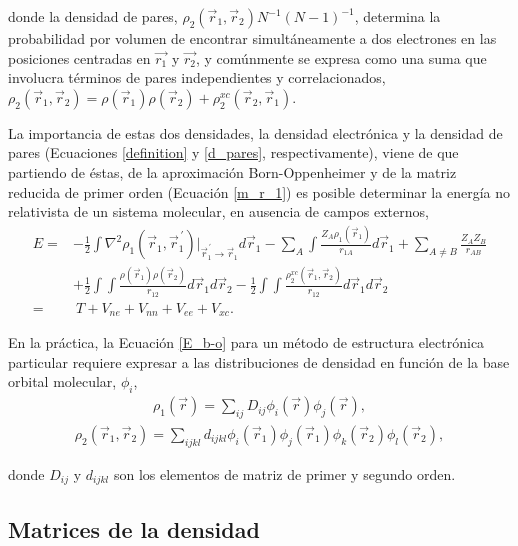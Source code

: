 \noindent donde la densidad de pares,
$\rho_2(\vec{r}_1,\vec{r}_2)N^{-1}(N-1)^{-1}$, determina la probabilidad por
volumen de encontrar simultáneamente a dos electrones en las posiciones
centradas en $\vec{r_1}$ y $\vec{r_2}$, y comúnmente se expresa como una suma
que involucra términos de pares independientes y correlacionados,
$\rho_2(\vec{r}_1, \vec{r}_2) = \rho(\vec{r}_1)\rho(\vec{r}_2) +
\rho_2^{xc}(\vec{r}_2, \vec{r}_1)$.

La importancia de estas dos densidades, la densidad electrónica y la densidad
de pares (Ecuaciones \ref{definition} y \ref{d_pares}, respectivamente), viene
de que partiendo de éstas, de la aproximación Born-Oppenheimer y de la matriz
reducida de primer orden (Ecuación \ref{m_r_1}) es posible determinar la
energía no relativista de un sistema molecular, en ausencia de campos externos,
%
\begin{align}
  E=&-\frac{1}{2}\int\nabla^{2}\rho_{1}(\vec{r}_1, \vec{r}^{\,\prime}_1) \biggr |_{\vec{r}^{\,\prime}_1 \rightarrow \vec{r}_1} d\vec{r}_1
      -\sum_{A}\int\frac{Z_A \rho_1 (\vec{r}_1)}{r_{1A}}d\vec{r}_1
      +\sum_{A\neq B}\frac{Z_A Z_{B}}{r_{AB}} \nonumber \\
      \phantom{=}&+\frac{1}{2}\int\int\frac{\rho (\vec{r}_1) \rho (\vec{r}_2)}{r_{12}} d\vec{r}_1 d\vec{r}_2
      -\frac{1}{2}\int\int\frac{\rho_2^{xc}(\vec{r}_1, \vec{r}_2)}{r_{12}} d\vec{r}_1 d\vec{r}_2 \nonumber \\
   =&\ T + V_{ne} + V_{nn} + V_{ee} + V_{xc}.
\label{E_b-o}
\end{align}

En la práctica, la Ecuación \ref{E_b-o} para un método de estructura
electrónica particular requiere expresar a las distribuciones de densidad en
función de la base orbital molecular, $\phi_i$,
%
\begin{align}
  \rho_1 (\vec{r}) = \sum_{ij} D_{ij}\phi_{i}(\vec{r})\phi_{j}(\vec{r}),
\end{align}
\begin{align}
  \rho_2 (\vec{r}_1, \vec{r}_2) = \sum_{ijkl}d_{ijkl}\phi_{i}(\vec{r}_1) \phi_{j}(\vec{r}_1)
  \phi_{k}(\vec{r}_2)\phi_{l}(\vec{r}_2),
\end{align}

\noindent donde $D_{ij}$ y $d_{ijkl}$ son los elementos de matriz de primer y segundo orden.

\subsection{Matrices de la densidad}

